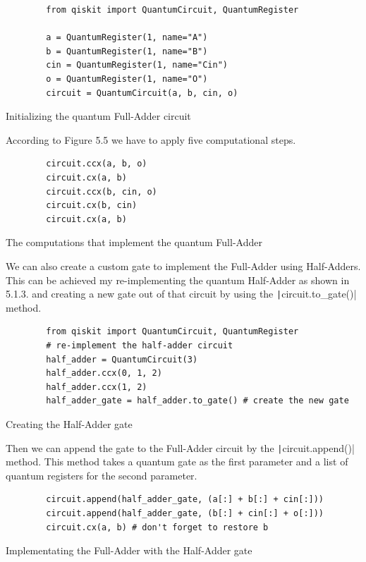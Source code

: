\begin{listing}[ht]
    \begin{verbatim}
        from qiskit import QuantumCircuit, QuantumRegister

        a = QuantumRegister(1, name="A")
        b = QuantumRegister(1, name="B")
        cin = QuantumRegister(1, name="Cin")
        o = QuantumRegister(1, name="O")
        circuit = QuantumCircuit(a, b, cin, o)
    \end{verbatim}
    \caption{Initializing the quantum Full-Adder circuit}
\end{listing}

According to Figure 5.5 we have to apply five computational steps.

\begin{listing}[ht]
    \begin{verbatim}
        circuit.ccx(a, b, o)
        circuit.cx(a, b)
        circuit.ccx(b, cin, o)
        circuit.cx(b, cin)
        circuit.cx(a, b)
    \end{verbatim}
    \caption{The computations that implement the quantum Full-Adder}
\end{listing}

We can also create a custom gate to implement the Full-Adder using Half-Adders. This can be achieved my re-implementing the
quantum Half-Adder as shown in 5.1.3. and creating a new gate out of that circuit by using the \texttt|circuit.to_gate()|
method.

\begin{listing}[ht]
    \begin{verbatim}
        from qiskit import QuantumCircuit, QuantumRegister
        # re-implement the half-adder circuit
        half_adder = QuantumCircuit(3)
        half_adder.ccx(0, 1, 2)
        half_adder.ccx(1, 2)
        half_adder_gate = half_adder.to_gate() # create the new gate
    \end{verbatim}
    \caption{Creating the Half-Adder gate}
\end{listing}

Then we can append the gate to the Full-Adder circuit by the \texttt|circuit.append()| method. This method takes
a quantum gate as the first parameter and a list of quantum registers for the second parameter.

\begin{listing}[ht]
    \begin{verbatim}
        circuit.append(half_adder_gate, (a[:] + b[:] + cin[:]))
        circuit.append(half_adder_gate, (b[:] + cin[:] + o[:]))
        circuit.cx(a, b) # don't forget to restore b
    \end{verbatim}
    \caption{Implementating the Full-Adder with the Half-Adder gate}
\end{listing}

